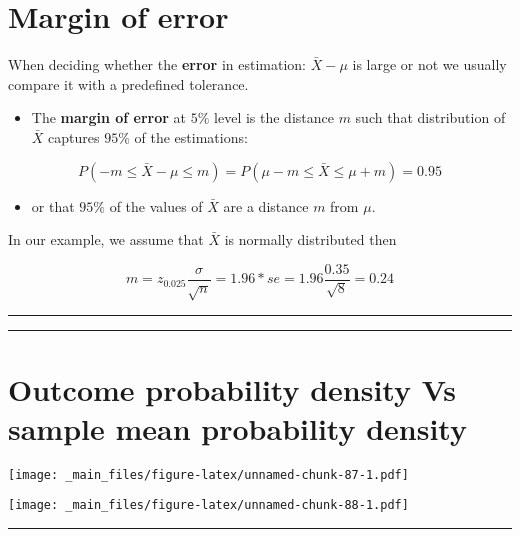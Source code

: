 \documentclass[
]{book}
\providecommand{\tightlist}{%
  \setlength{\itemsep}{0pt}\setlength{\parskip}{0pt}}
\begin{document}
\hypertarget{margin-of-error-2}{%
\section{Margin of error}\label{margin-of-error-2}}

When deciding whether the \textbf{error} in estimation: \(\bar{X}-\mu\) is large or not we usually compare it with a predefined tolerance.

\begin{itemize}
\tightlist
\item
  The \textbf{margin of error} at \(5\%\) level is the distance \(m\) such that distribution of \(\bar{X}\) captures \(95\%\) of the estimations:
\end{itemize}

\[P(-m \leq \bar{X}-\mu \leq m)=P(\mu-m \leq \bar{X} \leq\mu + m)=0.95\]

\begin{itemize}
\tightlist
\item
  or that \(95\%\) of the values of \(\bar{X}\) are a distance \(m\) from \(\mu\).
\end{itemize}

In our example, we assume that \(\bar{X}\) is normally distributed then

\[m=z_{0.025} \frac{\sigma}{\sqrt{n}}=1.96*se=1.96\frac{0.35}{\sqrt{8}}=0.24\]

\begin{center}\rule{0.5\linewidth}{0.5pt}\end{center}

\begin{center}\rule{0.5\linewidth}{0.5pt}\end{center}

\hypertarget{outcome-probability-density-vs-sample-mean-probability-density-1}{%
\section{Outcome probability density Vs sample mean probability density}\label{outcome-probability-density-vs-sample-mean-probability-density-1}}

\texttt{[image: \_main\_files/figure-latex/unnamed-chunk-87-1.pdf]}

\texttt{[image: \_main\_files/figure-latex/unnamed-chunk-88-1.pdf]}

\begin{center}\rule{0.5\linewidth}{0.5pt}\end{center}
\end{document}
